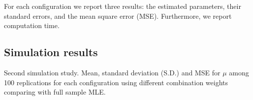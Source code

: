 \documentclass[11pt,a5paper,twoside]{book}
\begin{document}
{For each configuration we report three results: the estimated parameters, their standard errors, and the mean square error (MSE). Furthermore, we report computation time. 

\subsection{Simulation results}

\begin{table}[ht]
\centering
\caption{\small \linespread{1.1} Second simulation study. Mean, standard deviation (S.D.) and MSE for $\mu$ among 100 replications for each configuration using different combination weights comparing with full sample MLE.}
\label{tab_mu_est}

\vspace*{2mm}



\end{table}}
\end{document}
